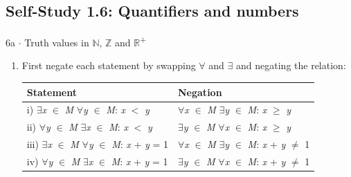 \documentclass[11pt]{article}
\begin{document}
\begin{keepsection}\subsection{Self-Study 1.6: Quantifiers and numbers}

\begin{workedbox}{6a \ensuremath{\cdot} Truth values in \ensuremath{\mathbb{N}}, \ensuremath{\mathbb{Z}} and \ensuremath{\mathbb{R}}\textsuperscript{+}}
\begin{enumerate}
\item {}
First negate each statement by swapping \ensuremath{\forall} and \ensuremath{\exists} and negating the relation:

\begin{center}\small\begin{tabularx}{\linewidth}{>{\raggedright\arraybackslash}X>{\raggedright\arraybackslash}X}\toprule
\textbf{Statement} & \textbf{Negation} \\ \midrule
i) \ensuremath{\exists}\textit{x} \ensuremath{\in} \textit{M} \ensuremath{\forall}\textit{y} \ensuremath{\in} \textit{M}: \textit{x} \ensuremath{<} \textit{y} & \ensuremath{\forall}\textit{x} \ensuremath{\in} \textit{M} \ensuremath{\exists}\textit{y} \ensuremath{\in} \textit{M}: \textit{x} \ensuremath{\geq} \textit{y} \\
ii) \ensuremath{\forall}\textit{y} \ensuremath{\in} \textit{M} \ensuremath{\exists}\textit{x} \ensuremath{\in} \textit{M}: \textit{x} \ensuremath{<} \textit{y} & \ensuremath{\exists}\textit{y} \ensuremath{\in} \textit{M} \ensuremath{\forall}\textit{x} \ensuremath{\in} \textit{M}: \textit{x} \ensuremath{\geq} \textit{y} \\
iii) \ensuremath{\exists}\textit{x} \ensuremath{\in} \textit{M} \ensuremath{\forall}\textit{y} \ensuremath{\in} \textit{M}: \textit{x} + \textit{y} = 1 & \ensuremath{\forall}\textit{x} \ensuremath{\in} \textit{M} \ensuremath{\exists}\textit{y} \ensuremath{\in} \textit{M}: \textit{x} + \textit{y} \ensuremath{\neq} 1 \\
iv) \ensuremath{\forall}\textit{y} \ensuremath{\in} \textit{M} \ensuremath{\exists}\textit{x} \ensuremath{\in} \textit{M}: \textit{x} + \textit{y} = 1 & \ensuremath{\exists}\textit{y} \ensuremath{\in} \textit{M} \ensuremath{\forall}\textit{x} \ensuremath{\in} \textit{M}: \textit{x} + \textit{y} \ensuremath{\neq} 1 \\
\bottomrule\end{tabularx}\end{center}

\end{enumerate}
\end{workedbox}
\end{keepsection}
\end{document}
